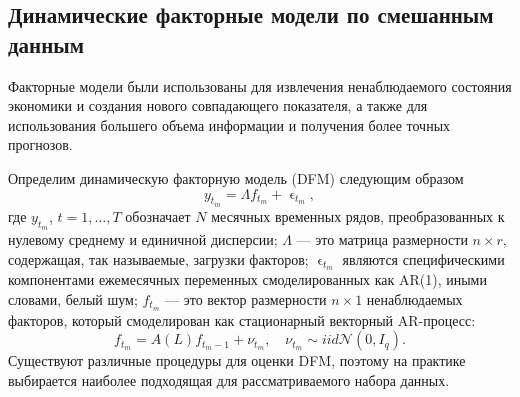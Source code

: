 \documentclass[a4paper, 12pt]{extarticle}
\numberwithin{equation}{subsection}
\renewcommand{\epsilon}{\upvarepsilon}
\begin{document}
	\subsection{Динамические факторные модели по смешанным данным}
	Факторные модели были использованы для извлечения ненаблюдаемого состояния экономики и создания нового совпадающего показателя, а также для использования большего объема информации и получения более точных
	прогнозов. 
	
	Определим динамическую факторную модель (DFM) следующим образом
	\begin{equation}
		y_{t_m}  = \Lambda f_{t_m} + \epsilon_{t_m},
	\end{equation}
	где $y_{t_m}$, $t = 1,\ldots, T$ обозначает $N$ месячных временных рядов, преобразованных к нулевому среднему и единичной дисперсии; $\Lambda$ --- это матрица размерности $n\times r$, содержащая, так называемые, загрузки факторов; $\epsilon_{t_m}$ являются специфическими компонентами ежемесячных переменных смоделированных как AR(1), иными словами, белый шум; $f_{t_m}$ --- это вектор размерности $n\times 1$ ненаблюдаемых факторов, который смоделирован как стационарный векторный AR-процесс:
	\begin{equation}
		f_{t_m} = A(L)f_{t_m-1} + \nu_{t_m},\quad \nu_{t_m}\sim iid \mathcal{N}(0, I_q).
	\end{equation}
	Существуют различные процедуры для оценки DFM, поэтому на практике выбирается наиболее подходящая для рассматриваемого набора данных.
\end{document}
